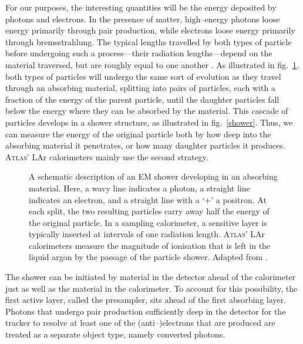For our purposes, the interesting quantities will be the energy deposited by photons and electrons. In the presence of matter, high--energy photons loose energy primarily through pair production, while electrons loose energy primarily through bremsstrahlung. The typical lengths travelled by both types of particle before undergoing such a process---their radiation lengths---depend on the material traversed, but are roughly equal to one another \cite{fernow:sampcal}. As illustrated in fig.~\ref{emshower}, both types of particles will undergo the same sort of evolution as they travel through an absorbing material, splitting into pairs of particles, each with a fraction of the energy of the parent particle, until the daughter particles fall below the energy where they can be absorbed by the material. This cascade of particles develops in a shower structure, as illustrated in fig.~\ref{shower}. Thus, we can measure the energy of the original particle both by how deep into the absorbing material it penetrates, or how many daughter particles it produces. \textsc{Atlas}' LAr calorimeters mainly use the second strategy.

\begin{figure}[htp]
\begin{minipage}[b]{.69\textwidth}
\begin{infilsf}\footnotesize

\end{infilsf}
\end{minipage}\hfill
\begin{minipage}[b]{.3\textwidth}
\caption{A schematic description of an EM shower developing in an absorbing material. Here, a wavy line indicates a photon, a straight line indicates an electron, and a straight line with a `$+$' a positron. At each split, the two resulting particles carry away half the energy of the original particle. In a sampling calorimeter, a sensitive layer is typically inserted at intervals of one radiation length. \textsc{Atlas}' LAr calorimeters measure the magnitude of ionisation that is left in the liquid argon by the passage of the particle shower. Adapted from \cite{fernow:sampcal}.
\label{emshower}
}
\end{minipage}
\end{figure}

The shower can be initiated by material in the detector ahead of the calorimeter just as well as the material in the calorimeter. To account for this possibility, the first active layer, called the presampler, sits ahead of the first absorbing layer. Photons that undergo pair production sufficiently deep in the detector for the tracker to resolve at least one of the (anti--)electrons that are produced are treated as a separate object type, namely converted photons.

